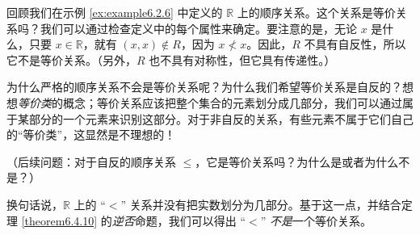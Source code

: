 \begin{example}
    回顾我们在示例 \ref{ex:example6.2.6} 中定义的 $\mathbb{R}$ 上的顺序关系。这个关系是等价关系吗？我们可以通过检查定义中的每个属性来确定。要注意的是，无论 $x$ 是什么，只要 $x \in \mathbb{R}$，就有 $(x, x) \notin R$，因为 $x \nless x$。因此，$R$ 不具有自反性，所以它不是等价关系。（另外，$R$ 也不具有对称性，但它具有传递性。）

    为什么严格的顺序关系不会是等价关系呢？为什么我们希望等价关系是自反的？想想\emph{等价类}的概念；等价关系应该把整个集合的元素划分成几部分，我们可以通过属于某部分的一个元素来识别这部分。对于非自反的关系，有些元素不属于它们自己的``等价类''，这显然是不理想的！

    （后续问题：对于自反的顺序关系 $\le$，它是等价关系吗？为什么是或者为什么不是？）
    
    换句话说，$\mathbb{R}$ 上的 ``$<$'' 关系并没有把实数划分为几部分。基于这一点，并结合定理 \ref{theorem6.4.10} 的\emph{逆否}命题，我们可以得出 ``$<$'' \emph{不是}一个等价关系。
\end{example}

